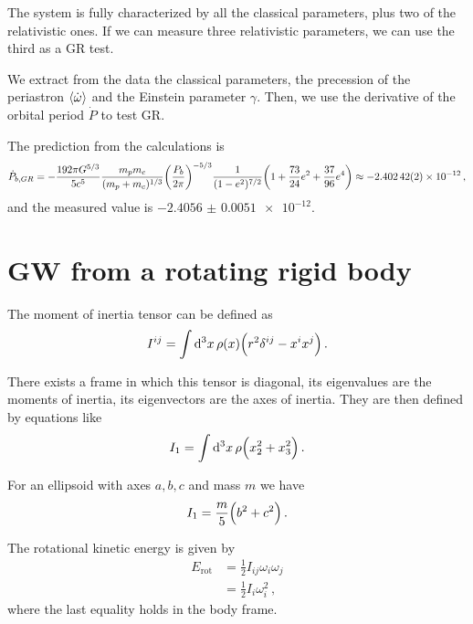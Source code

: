\documentclass[main.tex]{subfiles}
\begin{document}
The system is fully characterized by all the classical parameters, plus two of the relativistic ones. 
If we can measure three relativistic parameters, we can use the third as a GR test.

We extract from the data the classical parameters, the precession of the periastron \(\expval{\dot{\omega}}\) and the Einstein parameter \(\gamma \). Then,  we use the derivative of the orbital period \(\dot{P}\) to test GR.

The prediction from the calculations is 
%
\begin{align}
\dot{P}_{b, GR} = - \frac{192 \pi G^{5/3}}{5 c^{5}}
\frac{m_p m_c}{(m_p + m_c)^{1/3}} \qty( \frac{P_b}{2 \pi })^{- 5/3}
\frac{1}{(1 - e^2)^{7/2}} \qty(1 + \frac{73}{24} e^2 + \frac{37}{96}e^{4}) \approx -\num{2.40242(2)e-12}
\,,
\end{align}
%
and the measured value is \(- \num{2.4056(51)e-12}\).

\section{GW from a rotating rigid body}

The moment of inertia tensor can be defined as 
%
\begin{align}
I^{ij} = \int \dd[3]{x} \rho (x) \qty(r^2 \delta^{ij} - x^{i} x^{j})
\,.
\end{align}

There exists a frame in which this tensor is diagonal, its eigenvalues are the moments of inertia, its eigenvectors are the axes of inertia.
They are then defined by equations like 
%
\begin{align}
I_1 = \int \dd[3]{x} \rho \qty(x_2^2 + x_3^2) 
\,.
\end{align}
 
For an ellipsoid with axes \(a, b, c\) and mass \(m\) we have 
%
\begin{align}
I_1 = \frac{m}{5} \qty(b^2 +c^2)
\,.
\end{align}

The rotational kinetic energy is given by 
%
\begin{subequations}
\begin{align}
E _{\text{rot}} &= \frac{1}{2} I_{ij} \omega_{i} \omega_{j} \\ 
&= \frac{1}{2} I_i \omega_{i}^2
\,,
\end{align}
\end{subequations}
%
where the last equality holds in the body frame. 
\end{document}
